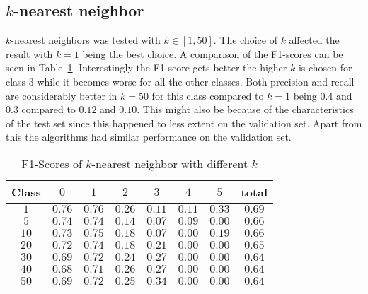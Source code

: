 \subsection{$k$-nearest neighbor}
$k$-nearest neighbors was tested with $k \in [1,50]$. The choice of $k$ affected the result with $k=1$ being the best choice. A comparison of the F1-scores can be seen in Table~\ref{ds2:table:knnf1}. Interestingly the F1-score gets better the higher $k$ is chosen for class $3$ while it becomes worse for all the other classes. Both precision and recall are considerably better in $k=50$ for this class compared to $k=1$
being $0.4$ and $0.3$ compared to $0.12$ and $0.10$. This might also be because of the characteristics of the test set since this happened to less extent on the validation set. Apart from this the algorithms had similar performance on the validation set.
\begin{table}[p]
	\begin{center}
		\begin{tabular}{|c|c|c|c|c|c|c|c|}
\hline Class & $0$ & $1$ & $2$ & $3$ &$4$  &$ 5$ & total \\
\hline $1$ & $0.76$ & $0.76$ & $0.26$ & $0.11$ & $0.11$ & $0.33$ & $0.69$ \\
\hline $5$ & $0.74$ & $0.74$ & $0.14$ & $0.07$ & $0.09$ & $0.00$ & $0.66$ \\
\hline $10$ & $0.73$ & $0.75$ &$0.18$ & $0.07$ & $0.00$ & $0.19$ & $0.66$ \\
\hline $20$ & $0.72$ & $0.74$ &$0.18$ & $0.21$ & $0.00$ &	$0.00$ & $0.65$ \\
\hline $30$ & $0.69$ & $0.72$ &$0.24$ & $0.27$ & $0.00$ & $0.00$ & $0.64$ \\
\hline $40$ & $0.68$ & $0.71$ &$0.26$ &	$0.27$ & $0.00$ & $0.00$ & $0.64$ \\
\hline $50$ & $0.69$ & $0.72$ &$0.25$ & $0.34$ & $0.00$ & $0.00$ & $0.64$ \\
\hline
	\end{tabular}
	\end{center}
	\caption{F1-Scores of $k$-nearest neighbor with different $k$\label{ds2:table:knnf1}}
\end{table}
